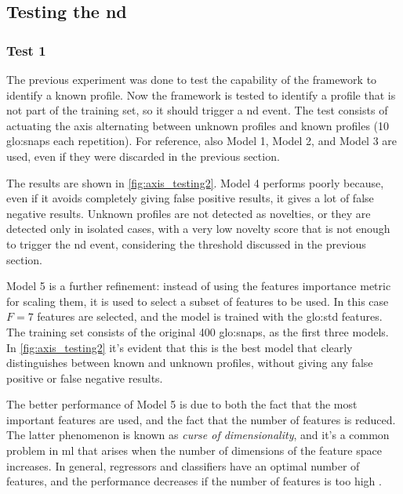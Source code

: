 \subsection{Testing the \gls{nd}}
\subsubsection{Test 1}
The previous experiment was done to test the capability of the framework to identify a known profile. Now the framework is tested to identify a profile that is not part of the training set, so it should trigger a \gls{nd} event. The test consists of actuating the axis alternating between unknown profiles and known profiles (10 \gls{glo:snap}s each repetition). For reference, also Model 1, Model 2, and Model 3 are used, even if they were discarded in the previous section. 

The results are shown in \autoref{fig:axis_testing2}. Model 4 performs poorly because, even if it avoids completely giving false positive results, it gives a lot of false negative results. Unknown profiles are not detected as novelties, or they are detected only in isolated cases, with a very low novelty score that is not enough to trigger the \gls{nd} event, considering the threshold discussed in the previous section.

Model 5 is a further refinement: instead of using the features importance metric for scaling them, it is used to select a subset of features to be used. In this case $F=7$ features are selected, and the model is trained with the \gls{glo:std} features. The training set consists of the original 400 \gls{glo:snap}s, as the first three models. In \autoref{fig:axis_testing2} it's evident that this is the best model that clearly distinguishes between known and unknown profiles, without giving any false positive or false negative results.

The better performance of Model 5 is due to both the fact that the most important features are used, and the fact that the number of features is reduced. The latter phenomenon is known as \emph{curse of dimensionality}, and it's a common problem in \gls{ml} that arises when the number of dimensions of the feature space increases. In general, regressors and classifiers have an optimal number of features, and the performance decreases if the number of features is too high \cite{curse_dim}. 

